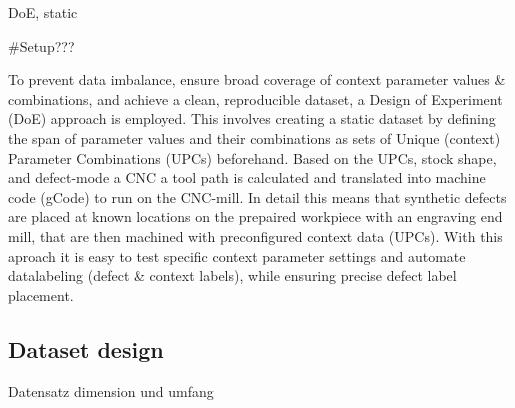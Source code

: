 \documentclass[5p,times,procedia]{elsarticle}
\begin{document}
DoE, static


\#Setup???

To prevent data imbalance, ensure broad coverage of context parameter values \& combinations, and achieve a clean, reproducible dataset, a Design of Experiment (DoE) approach is employed. This involves creating a static dataset by defining the span of parameter values and their combinations as sets of Unique (context) Parameter Combinations (UPCs) beforehand.
Based on the UPCs, stock shape, and defect-mode a CNC a tool path is calculated and translated into machine code (gCode) to run on the CNC-mill. 
In detail this means that synthetic defects are placed at known locations on the prepaired workpiece with an engraving end mill, that are then machined with preconfigured context data (UPCs). With this aproach it is easy to test specific context parameter settings and automate datalabeling (defect \& context labels), while ensuring precise defect label placement.




 








\subsection{Dataset design}
\vspace*{-\baselineskip}
Datensatz dimension und umfang
\end{document}
